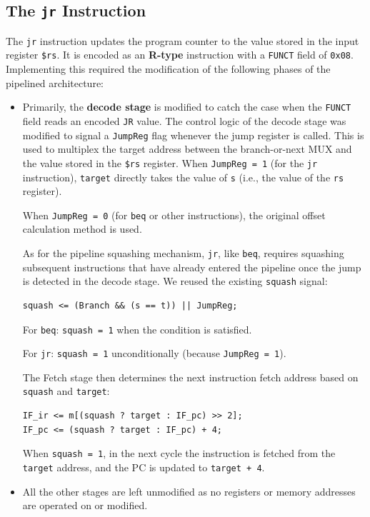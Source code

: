 \documentclass[conference]{IEEEtran}
\begin{document}
\subsection{The \texttt{jr} Instruction}
The \texttt{jr} instruction updates the program counter to the value stored in
the input register \texttt{\$rs}. It is encoded as an \textbf{R-type}
instruction with a \texttt{FUNCT} field of \texttt{0x08}. Implementing this
required the modification of the following phases of the pipelined architecture:
\begin{itemize}
    \item Primarily, the \textbf{decode stage} is modified to catch the case when
        the \texttt{FUNCT} field reads an encoded \texttt{JR} value. The
        control logic of the decode stage was modified to signal a
        \texttt{JumpReg} flag whenever the jump register is called. This is
        used to multiplex the target address between the branch-or-next MUX and
        the value stored in the \texttt{\$rs} register. When \texttt{JumpReg = 1} (for the \texttt{jr} instruction), \texttt{target} directly takes the value of \texttt{s} (i.e., the value of the \texttt{rs} register).

When \texttt{JumpReg = 0} (for \texttt{beq} or other instructions), the original offset calculation method is used.

As for the pipeline squashing mechanism, \texttt{jr}, like \texttt{beq}, requires squashing subsequent instructions that have already entered the pipeline once the jump is detected in the decode stage. We reused the existing \texttt{squash} signal:

\begin{verbatim}
squash <= (Branch && (s == t)) || JumpReg;
\end{verbatim}

For \texttt{beq}: \texttt{squash = 1} when the condition is satisfied.

For \texttt{jr}: \texttt{squash = 1} unconditionally (because \texttt{JumpReg = 1}).

The Fetch stage then determines the next instruction fetch address based on \texttt{squash} and \texttt{target}:

\begin{verbatim}
IF_ir <= m[(squash ? target : IF_pc) >> 2];
IF_pc <= (squash ? target : IF_pc) + 4;
\end{verbatim}

When \texttt{squash = 1}, in the next cycle the instruction is fetched from the \texttt{target} address, and the PC is updated to \texttt{target + 4}.
    \item All the other stages are left unmodified as no registers or memory
        addresses are operated on or modified.
\end{itemize}
\end{document}
